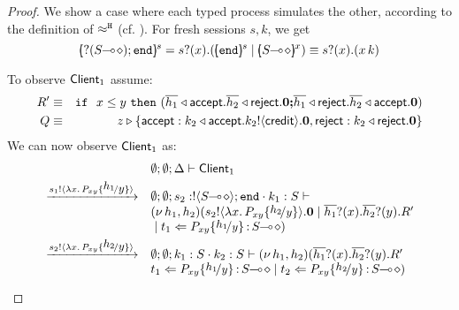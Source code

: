 \begin{proof}
	\noi	We show a case where each typed process simulates the other, according to the definition of
			$\approx^\mathtt{H}$ (cf. ).
 For fresh sessions $s, k$, we get 
	$$
		\mapchar{\btinp{\lhot{S}} \tinact}{s} = \binp{s}{x} (\mapchar{\tinact}{s} \Par \mapchar{\lhot{S}}{x})
		\scong \binp{s}{x} (\appl{x}{k})
	$$
	

	\noi To observe $\mathsf{Client}_1$ assume:
%
	\begin{eqnarray*}
		R' &\equiv& \mathtt{if}\ \ x \leq y\ \mathtt{then}\  (\overline{h_1} \triangleleft \mathsf{accept} . \overline{h_2} \triangleleft \mathsf{reject} . \mathbf{0}
		\boldsymbol{;} \overline{h_1} \triangleleft \mathsf{reject} . \overline{h_2} \triangleleft \mathsf{accept} . \mathbf{0})\\
		Q &\equiv& z \triangleright \{\mathsf{accept}: k_2 \triangleleft \mathsf{accept} . k_2 ! \langle \mathsf{credit} \rangle . \mathbf{0}, \mathsf{reject}: k_2 \triangleleft \mathsf{reject} . \mathbf{0}\}
	\end{eqnarray*}
%
	\noi We can now observe $\mathsf{Client}_1$ as:
\[
	\begin{array}{ll}
		& \es; \es; \Delta \proves \Client_1
		\\[1mm]

		\by{\bactout{s_1}{\abs{x}{P_{xy} \subst{h_1}{y}}}}&
		\es; \es; s_2: \btout{\lhot{S}} \tinact \cat k_1: S \proves \\
		& \newsp{h_1, h_2}{\bout{s_2}{\abs{x}{P_{xy} \subst{h_2}{y}}} \inact
		\Par \binp{\dual{h_1}}{x} \binp{\dual{h_2}}{y} R'\\
		& \Par \ftrigger{t_1}{P_{xy} \subst{h_1}{y}}{\lhot{S}}}
		\\[1mm]

		\by{\bactout{s_2}{\abs{x}{P_{xy} \subst{h_2}{y}}}}&
		\es; \es; k_1: S \cat k_2: S \proves \newsp{h_1, h_2}{
		\binp{\dual{h_1}}{x} \binp{\dual{h_2}}{y} R'\\
		& \ftrigger{t_1}{P_{xy} \subst{h_1}{y}}{\lhot{S}} \Par \ftrigger{t_2}{P_{xy} \subst{h_2}{y}}{\lhot{S}}}
		\\[1mm]


\end{array}\]
\end{proof}
